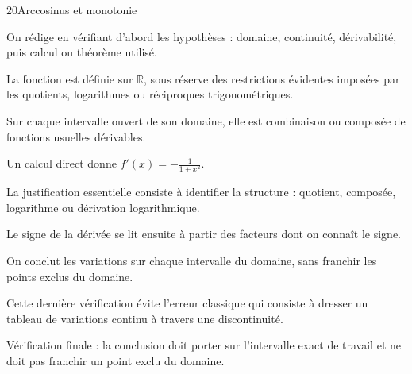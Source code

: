\documentclass[11pt,a4paper]{article}
\newcommand{\R}{\mathbb{R}}
\begin{document}
\begin{corrbox}{20}{Arccosinus et monotonie}

\begin{methodebox}
On rédige en vérifiant d'abord les hypothèses : domaine, continuité, dérivabilité, puis calcul ou théorème utilisé.
\end{methodebox}

La fonction est définie sur $\R$, sous réserve des restrictions évidentes imposées par les quotients, logarithmes ou réciproques trigonométriques.


Sur chaque intervalle ouvert de son domaine, elle est combinaison ou composée de fonctions usuelles dérivables.


Un calcul direct donne $f'(x)=-\frac{1}{1+x^2}$.


La justification essentielle consiste à identifier la structure : quotient, composée, logarithme ou dérivation logarithmique.


Le signe de la dérivée se lit ensuite à partir des facteurs dont on connaît le signe.


On conclut les variations sur chaque intervalle du domaine, sans franchir les points exclus du domaine.


Cette dernière vérification évite l'erreur classique qui consiste à dresser un tableau de variations continu à travers une discontinuité.


\begin{attentionbox}
Vérification finale : la conclusion doit porter sur l'intervalle exact de travail et ne doit pas franchir un point exclu du domaine.
\end{attentionbox}

\end{corrbox}
\end{document}
